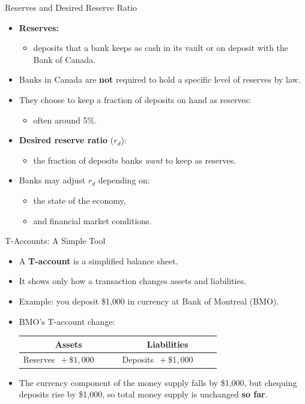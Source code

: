 \documentclass[aspectratio=169]{beamer}
\begin{document}
\begin{frame}{Reserves and Desired Reserve Ratio}
\transfade
\begin{itemize}
  \item \textbf{Reserves:}
  \begin{itemize}
    \item deposits that a bank keeps as cash in its vault or on deposit with the Bank of Canada.
  \end{itemize}
  \item Banks in Canada are \textbf{not} required to hold a specific level of reserves by law.
  \item They choose to keep a fraction of deposits on hand as reserves:
  \begin{itemize}
    \item often around 5\%.
  \end{itemize}
  \item \textbf{Desired reserve ratio} (\(r_{d}\)):
  \begin{itemize}
    \item the fraction of deposits banks \emph{want} to keep as reserves.
  \end{itemize}
  \item Banks may adjust \(r_{d}\) depending on:
  \begin{itemize}
    \item the state of the economy,
    \item and financial market conditions.
  \end{itemize}
\end{itemize}
\end{frame}

\begin{frame}{T-Accounts: A Simple Tool}
\transfade
\begin{itemize}
  \item A \textbf{T-account} is a simplified balance sheet.
  \item It shows only how a transaction \alert{changes} assets and liabilities.
  \item Example: you deposit \$1{,}000 in currency at Bank of Montreal (BMO).
  \item BMO's T-account change:
  \begin{center}
    \begin{tabular}{p{0.4\linewidth} p{0.4\linewidth}}
    \toprule
    \multicolumn{1}{c}{\textbf{Assets}} & \multicolumn{1}{c}{\textbf{Liabilities}} \\
    \midrule
    Reserves \(\,+ \$1{,}000\) & Deposits \(\,+ \$1{,}000\) \\
    \bottomrule
    \end{tabular}
  \end{center}
  \item The currency component of the money supply falls by \$1{,}000, but chequing deposits rise by \$1{,}000, so total money supply is unchanged \textbf{so far}.
\end{itemize}
\end{frame}
\end{document}
